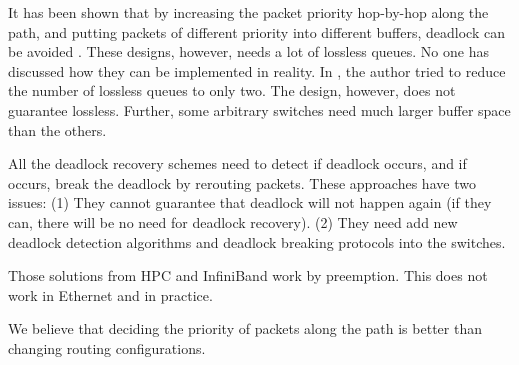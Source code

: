  It has been shown that by increasing the packet priority hop-by-hop along the path, and putting packets of different priority into different buffers, deadlock can be avoided \cite{firstpaper,survey,datanetworks,karol2003prevention}. These designs, however, needs a lot of lossless queues. No one
has discussed how they can be implemented in reality. In \cite{dag}, the author tried to reduce the number of lossless queues to only two. The design, however, does not guarantee lossless. Further, some arbitrary switches need much larger buffer space than the others.

All the deadlock recovery schemes \cite{isca95,shpiner2016unlocking} need to detect if deadlock occurs, and if occurs, break the deadlock by rerouting packets. These approaches have two issues: (1) They cannot guarantee that deadlock will not happen again (if they can, there will be no need for deadlock recovery). (2) They need add new deadlock detection algorithms and deadlock breaking protocols into the switches.

 Those solutions from HPC and InfiniBand
work by preemption. This does not work in Ethernet and in practice.

We believe that deciding the priority of packets along the path is better than changing
routing configurations.
